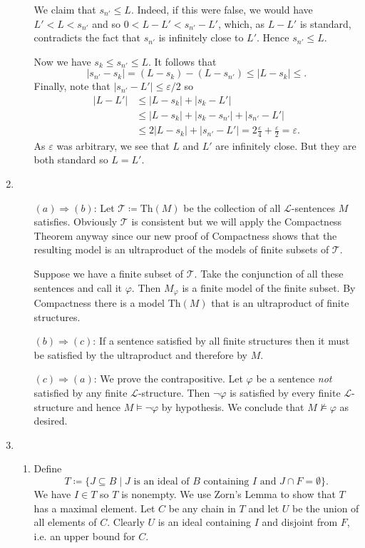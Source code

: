 \documentclass{article}
\theoremstyle{theorem}
\begin{document}
\begin{enumerate}[leftmargin=*]
\begin{enumerate}
				We claim that $s_{n'} \leq L$. Indeed, if this were false, we would have $L' < L < s_{n'}$ and so $0< L-L' < s_{n'} - L'$, which, as $L-L'$ is standard, contradicts the fact that $s_{n'}$ is infinitely close to $L'$. Hence $s_{n'} \leq L$.
				
				Now we have $s_k\leq s_{n'} \leq L$. It follows that
				\begin{equation*}
					|s_{n'} - s_k| = (L - s_k) - (L-s_{n'}) \leq |L-s_k|\leq .
				\end{equation*}
				Finally, note that $|s_{n'} - L'| \leq \varepsilon/2$ so
				\begin{align*}
					|L-L'| &\leq |L- s_k| + |s_k - L'|\\
					&\leq |L-s_k| + |s_k - s_{n'}| + |s_{n'} - L'|\\
					&\leq 2|L-s_k| + |s_{n'} - L'| = 2\frac{\varepsilon}{4} + \frac{\varepsilon}{2} = \varepsilon.
				\end{align*}
				As $\varepsilon$ was arbitrary, we see that $L$ and $L'$ are infinitely close. But they are both standard so $L=L'$.
			\end{enumerate}
			\item\leavevmode
			\begin{itemize}
				\item[$(a)\Rightarrow (b)$:] Let $\mathcal{T} \coloneqq \text{Th}(M)$ be the collection of all $\mathcal{L}$-sentences $M$ satisfies. Obviously $\mathcal{T}$ is consistent but we will apply the Compactness Theorem anyway since our new proof of Compactness shows that the resulting model is an ultraproduct of the models of finite subsets of $\mathcal{T}$.
				
				Suppose we have a finite subset of $\mathcal{T}$. Take the conjunction of all these sentences and call it $\varphi$. Then $M_{\varphi}$ is a finite model of the finite subset. By Compactness there is a model $\text{Th}(M)$ that is an ultraproduct of finite structures.
				\item[$(b)\Rightarrow (c)$:] If a sentence satisfied by all finite structures then it must be satisfied by the ultraproduct and therefore by $M$.
				\item[$(c)\Rightarrow (a)$:] We prove the contrapositive. Let $\varphi$ be a sentence \emph{not} satisfied by any finite $\mathcal{L}$-structure. Then $\neg \varphi$ is satisfied by every finite $\mathcal{L}$-structure and hence $M\models \neg \varphi$ by hypothesis. We conclude that $M\nvDash \varphi$ as desired.
			\end{itemize}
			\item
			\begin{enumerate}
				\item Define 
				\[
				T \coloneqq \{J \subseteq B \mid J \text{ is an ideal of $B$ containing $I$ and }J\cap F =\emptyset\}.
				\]
				We have $I\in T$ so $T$ is nonempty. We use Zorn's Lemma to show that $T$ has a maximal element. Let $C$ be any chain in $T$ and let $U$ be the union of all elements of $C$. Clearly $U$ is an ideal containing $I$ and disjoint from $F$, i.e. an upper bound for $C$.
				

\end{enumerate}
\end{enumerate}
\end{document}
